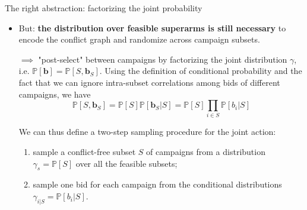 \begin{frame}{The right abstraction: factorizing the joint probability}
    \begin{itemize}
        \item But: \textbf{the distribution over feasible superarms is still necessary} to encode the conflict graph and randomize across campaign subsets.

        \vspace{0.2cm}

        $\implies$ "post-select" between campaigns by factorizing the joint distribution $\gamma$, i.e. $\mathbb{P}\left[ \mathbf{b} \right] = \mathbb{P}\left[ S, \mathbf{b}_S \right]$. Using the definition of conditional probability and the fact that we can ignore intra-subset correlations among bids of different campaigns, we have
        \[\mathbb{P}\left[ S, \mathbf{b}_S \right] = \mathbb{P}\left[ S \right] \mathbb{P}\left[ \mathbf{b}_S | S \right] = \mathbb{P}\left[ S \right] \prod_{i \in S}\mathbb{P}\left[ b_i | S \right]\]

        We can thus define a two-step sampling procedure for the joint action:
        \begin{enumerate}
            \item sample a conflict-free subset $S$ of campaigns from a distribution $\gamma_s = \mathbb{P}\left[ S \right]$ over all the feasible subsets;
            \item sample one bid for each campaign from the conditional distributions $\gamma_{i|S} = \mathbb{P}\left[ b_i | S \right]$.
        \end{enumerate} 
    \end{itemize}
\end{frame}

